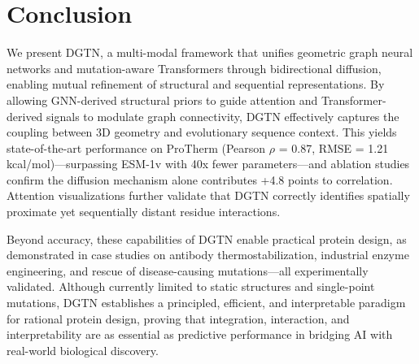 \documentclass[11pt]{article}
\begin{document}
\section{Conclusion}


We present DGTN, a multi-modal framework that unifies geometric graph neural
networks and mutation-aware Transformers through bidirectional diffusion,
enabling mutual refinement of structural and sequential representations. By
allowing GNN-derived structural priors to guide attention and
Transformer-derived signals to modulate graph connectivity, DGTN effectively
captures the coupling between 3D geometry and evolutionary sequence context.
This yields state-of-the-art performance on ProTherm (Pearson $\rho$ = 0.87, RMSE =
1.21 kcal/mol)—surpassing ESM-1v with 40x fewer parameters—and ablation studies
confirm the diffusion mechanism alone contributes +4.8 points to correlation.
Attention visualizations further validate that DGTN correctly identifies
spatially proximate yet sequentially distant residue interactions.

Beyond accuracy, these capabilities of DGTN enable
practical protein design, as demonstrated in case studies on antibody
thermostabilization, industrial enzyme engineering, and rescue of
disease-causing mutations—all experimentally validated. Although currently
limited to static structures and single-point mutations, DGTN establishes a
principled, efficient, and interpretable paradigm for rational protein design,
proving that integration, interaction, and interpretability are as essential as
predictive performance in bridging AI with real-world biological discovery.
\end{document}
